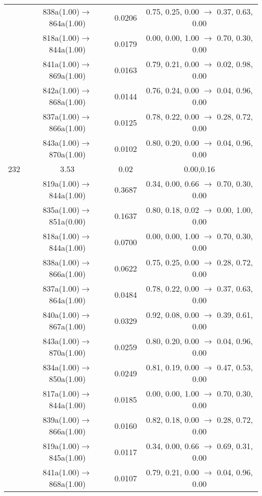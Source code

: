 \documentclass[10pt,a4paper]{article}
\begin{document}
\begin{longtable}{c|c|c|c}
 	& 838a(1.00)$\rightarrow$864a(1.00) &	 0.0206 &	 0.75, 0.25, 0.00 $\rightarrow$ 0.37, 0.63, 0.00 \\ 
 	& 818a(1.00)$\rightarrow$844a(1.00) &	 0.0179 &	 0.00, 0.00, 1.00 $\rightarrow$ 0.70, 0.30, 0.00 \\ 
 	& 841a(1.00)$\rightarrow$869a(1.00) &	 0.0163 &	 0.79, 0.21, 0.00 $\rightarrow$ 0.02, 0.98, 0.00 \\ 
 	& 842a(1.00)$\rightarrow$868a(1.00) &	 0.0144 &	 0.76, 0.24, 0.00 $\rightarrow$ 0.04, 0.96, 0.00 \\ 
 	& 837a(1.00)$\rightarrow$866a(1.00) &	 0.0125 &	 0.78, 0.22, 0.00 $\rightarrow$ 0.28, 0.72, 0.00 \\ 
 	& 843a(1.00)$\rightarrow$870a(1.00) &	 0.0102 &	 0.80, 0.20, 0.00 $\rightarrow$ 0.04, 0.96, 0.00 \\ 
 \hline232 &	 3.53 &	 0.02 &	 0.00,0.16 \\ 
  	& 819a(1.00)$\rightarrow$844a(1.00) &	 0.3687 &	 0.34, 0.00, 0.66 $\rightarrow$ 0.70, 0.30, 0.00 \\ 
 	& 835a(1.00)$\rightarrow$851a(0.00) &	 0.1637 &	 0.80, 0.18, 0.02 $\rightarrow$ 0.00, 1.00, 0.00 \\ 
 	& 818a(1.00)$\rightarrow$844a(1.00) &	 0.0700 &	 0.00, 0.00, 1.00 $\rightarrow$ 0.70, 0.30, 0.00 \\ 
 	& 838a(1.00)$\rightarrow$866a(1.00) &	 0.0622 &	 0.75, 0.25, 0.00 $\rightarrow$ 0.28, 0.72, 0.00 \\ 
 	& 837a(1.00)$\rightarrow$864a(1.00) &	 0.0484 &	 0.78, 0.22, 0.00 $\rightarrow$ 0.37, 0.63, 0.00 \\ 
 	& 840a(1.00)$\rightarrow$867a(1.00) &	 0.0329 &	 0.92, 0.08, 0.00 $\rightarrow$ 0.39, 0.61, 0.00 \\ 
 	& 843a(1.00)$\rightarrow$870a(1.00) &	 0.0259 &	 0.80, 0.20, 0.00 $\rightarrow$ 0.04, 0.96, 0.00 \\ 
 	& 834a(1.00)$\rightarrow$850a(1.00) &	 0.0249 &	 0.81, 0.19, 0.00 $\rightarrow$ 0.47, 0.53, 0.00 \\ 
 	& 817a(1.00)$\rightarrow$844a(1.00) &	 0.0185 &	 0.00, 0.00, 1.00 $\rightarrow$ 0.70, 0.30, 0.00 \\ 
 	& 839a(1.00)$\rightarrow$866a(1.00) &	 0.0160 &	 0.82, 0.18, 0.00 $\rightarrow$ 0.28, 0.72, 0.00 \\ 
 	& 819a(1.00)$\rightarrow$845a(1.00) &	 0.0117 &	 0.34, 0.00, 0.66 $\rightarrow$ 0.69, 0.31, 0.00 \\ 
 	& 841a(1.00)$\rightarrow$868a(1.00) &	 0.0107 &	 0.79, 0.21, 0.00 $\rightarrow$ 0.04, 0.96, 0.00 \\ 

\end{longtable}
\end{document}
